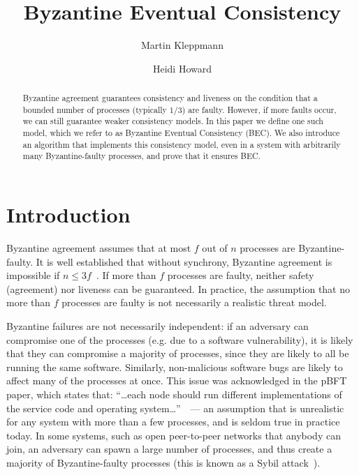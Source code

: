 \documentclass[a4paper,anonymous,USenglish]{lipics-v2019}
\title{Byzantine Eventual Consistency}
\author{Martin Kleppmann}{University of Cambridge}{mk428@cst.cam.ac.uk}{https://orcid.org/0000-0001-7252-6958}{Supported by a Leverhulme Trust Early Career Fellowship and by the Isaac Newton Trust.}
\author{Heidi Howard}{University of Cambridge}{hh360@cst.cam.ac.uk}{https://orcid.org/0000-0001-5256-7664}{}
\begin{document}
\maketitle
\begin{abstract}
    Byzantine agreement guarantees consistency and liveness on the condition that a bounded number of processes (typically $1/3$) are faulty.
    However, if more faults occur, we can still guarantee weaker consistency models. 
    In this paper we define one such model, which we refer to as Byzantine Eventual Consistency (BEC).
    We also introduce an algorithm that implements this consistency model, even in a system with arbitrarily many Byzantine-faulty processes, and prove that it ensures BEC.
\end{abstract}
\maketitle

\section{Introduction}

Byzantine agreement assumes that at most $f$ out of $n$ processes are Byzantine-faulty.
It is well established that without synchrony, Byzantine agreement is impossible if $n\leq3f$~\cite{Dwork:1988,Lamport:1982}.
If more than $f$ processes are faulty, neither safety (agreement) nor liveness can be guaranteed.
In practice, the assumption that no more than $f$ processes are faulty is not necessarily a realistic threat model.

Byzantine failures are not necessarily independent: if an adversary can compromise one of the processes (e.g. due to a software vulnerability), it is likely that they can compromise a majority of processes, since they are likely to all be running the same software. 
Similarly, non-malicious software bugs are likely to affect many of the processes at once.
This issue was acknowledged in the pBFT paper, which states that: ``{\dots}each node should run different implementations of the service code and operating system{\dots}''~\cite{Castro:1999}~--- an assumption that is unrealistic for any system with more than a few processes, and is seldom true in practice today.
In some systems, such as open peer-to-peer networks that anybody can join, an adversary can spawn a large number of processes, and thus create a majority of Byzantine-faulty processes (this is known as a Sybil attack~\cite{Douceur:2002}).
\end{document}
